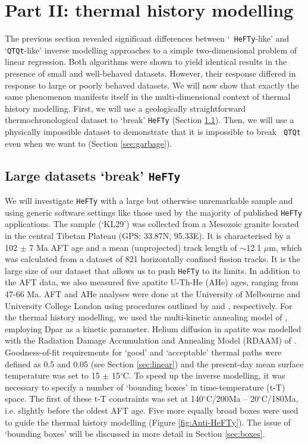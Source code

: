 \documentclass{article}
\begin{document}
\section{Part II: thermal history modelling}
\label{sec:tTmodelling}

The previous section revealed significant differences between `{\tt
  HeFTy}-like' and `{\tt QTQt}-like' inverse modelling approaches to a
simple two-dimensional problem of linear regression.  Both algorithms
were shown to yield identical results in the presence of small and
well-behaved datasets. However, their response differed in response to
large or poorly behaved datasets. We will now show that exactly the
same phenomenon manifests itself in the multi-dimensional context of
thermal history modelling. First, we will use a geologically
straightforward thermochronological dataset to `break' {\tt HeFTy}
(Section \ref{sec:breakingbad}). Then, we will use a physically
impossible dataset to demonstrate that it is impossible to break {\tt
  QTQt} even when we want to (Section \ref{sec:garbage}).

\subsection{Large datasets `break' {\tt HeFTy}}
\label{sec:breakingbad}

We will investigate {\tt HeFTy} with a large but otherwise
unremarkable sample and using generic software settings like those
used by the majority of published {\tt HeFTy} applications.  The
sample (`KL29') was collected from a Mesozoic granite located in the
central Tibetan Plateau (GPS: 33.87N, 95.33E). It is characterised by
a 102 $\pm$ 7 Ma AFT age and a mean (unprojected) track length of
$\sim$12.1 $\mu$m, which was calculated from a dataset of 821
horizontally confined fission tracks. It is the large size of our
dataset that allows us to push {\tt HeFTy} to its limits. In addition
to the AFT data, we also measured five apatite U-Th-He (AHe) ages,
ranging from 47-66 Ma. AFT and AHe analyses were done at the
University of Melbourne and University College London using procedures
outlined by \cite{tian2014} and \cite{carter2014}, respectively.
For the thermal history modelling, we used the multi-kinetic annealing
model of \cite{ketcham2007}, employing Dpar as a kinetic
parameter. Helium diffusion in apatite was modelled with the Radiation
Damage Accumulation and Annealing Model (RDAAM) of
\cite{flowers2009}. Goodness-of-fit requirements for `good' and
`acceptable' thermal paths were defined as 0.5 and 0.05 (see Section
\ref{sec:linear}) and the present-day mean surface temperature was set
to 15 $\pm$ 15$^{\circ}$C. To speed up the inverse modelling, it was
necessary to specify a number of `bounding boxes' in time-temperature
(t-T) space.  The first of these t-T constraints was set at
140$^{\circ}$C/200Ma -- 20$^{\circ}$C/180Ma, i.e. slightly before the
oldest AFT age.  Five more equally broad boxes were used to guide the
thermal history modelling (Figure \ref{fig:Anti-HeFTy}). The issue of
`bounding boxes' will be discussed in more detail in Section
\ref{sec:boxes}.\\
\end{document}
